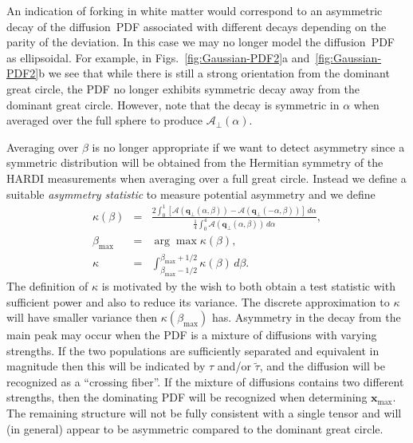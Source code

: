 \documentclass[dvips,aoas,preprint]{imsart}
\numberwithin{equation}{section}
\theoremstyle{plain}
\newcommand{\q}{\mathbf{q}}
\newcommand{\x}{\mathbf{x}}
\newcommand{\cA}{\mathcal{A}}
\begin{document}

An indication of forking in white matter would correspond to an
asymmetric decay of the diffusion~PDF associated with different decays
depending on the parity of the deviation.  In this case we may no
longer model the diffusion~PDF as ellipsoidal.  For example, in
Figs.~\ref{fig:Gaussian-PDF2}a and~\ref{fig:Gaussian-PDF2}b we see
that while there is still a strong orientation from the dominant great
circle, the PDF no longer exhibits symmetric decay away from the
dominant great circle.  However, note that the decay is symmetric in
$\alpha$ when averaged over the full sphere to produce
${\cA}_{\perp}(\alpha)$.

Averaging over $\beta$ is no longer appropriate if we want to detect
asymmetry since a symmetric distribution will be obtained from the
Hermitian symmetry of the HARDI measurements when averaging over a
full great circle.  Instead we define a suitable {\em asymmetry
statistic} to measure potential asymmetry and we define
\begin{eqnarray}
  \kappa(\beta) &=& \frac{2\int_{0}^{1}
    \left[\cA\left(\q_\perp(\alpha,\beta)\right) -
      \cA\left(\q_\perp(-\alpha,\beta)\right)\right] \, d\alpha}
        {\frac{1}{4} \int_{0}^{4}
          \cA\left(\q_\perp(\alpha,\beta)\right) \, d\alpha},\\
        \beta_\text{max} &=& \arg \max\kappa(\beta),\\
        \kappa &=& \int_{\beta_\text{max}-1/2}^{\beta_\text{max}+1/2}
        \kappa(\beta) \, d\beta.
\end{eqnarray}
The definition of $\kappa$ is motivated by the wish to both obtain a test statistic with
sufficient power and also to reduce its variance.  The discrete
approximation to $\kappa$ will have smaller variance then
$\kappa(\beta_\text{max})$ has.  Asymmetry in the decay from the main
peak may occur when the PDF is a mixture of diffusions with varying
strengths.  If the two populations are sufficiently separated and
equivalent in magnitude then this will be indicated by $\tau$ and/or
$\tilde\tau$, and the diffusion will be recognized as a ``crossing
fiber''.  If the mixture of diffusions contains two different
strengths, then the dominating PDF will be recognized when determining
$\x_\text{max}$.  The remaining structure will not be fully consistent
with a single tensor and will (in general) appear to be asymmetric
compared to the dominant great circle.
\end{document}
